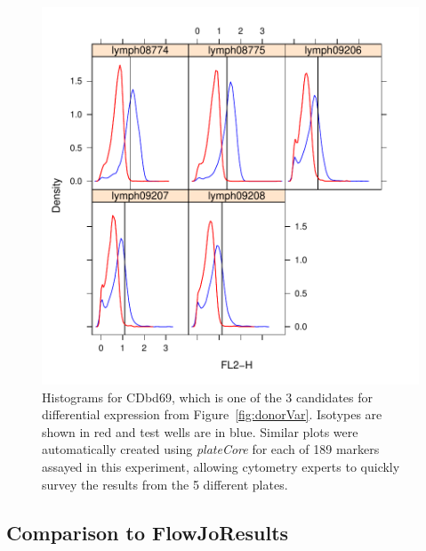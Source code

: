 \documentclass[12pt]{article}
\newcommand{\Rpackage}[1]{{\textit{#1}}}
\begin{document}
\begin{figure}
\centering
\includegraphics{outline-pbmcCDbd69}
\caption{Histograms for CDbd69, which is one of the 3 candidates for differential expression from Figure~\ref{fig:donorVar}.
Isotypes are shown in red and test wells are in blue. Similar plots were automatically created using \Rpackage{plateCore}
for each of 189 markers assayed in this experiment, allowing cytometry experts to quickly survey the results from the 5
different plates.}
\label{fig:pbmcCDbd69}
\end{figure}



\clearpage
\subsection*{Comparison to FlowJo\texttrademark Results}
\end{document}
